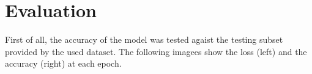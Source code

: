 \chapter{Evaluation}

First of all, the accuracy of the model was tested agaist the testing subset provided by the used dataset. The following imagees show the loss (left) and
the accuracy (right) at each epoch.

